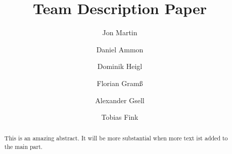 \documentclass[runningheads,a4paper]{llncs}
\begin{document}
\mainmatter  %

\title{Team Description Paper}


%
%
\author{Jon Martin
\and Daniel Ammon\and Dominik Heigl\and Florian Gram{\ss} \and Alexander Gsell \and Tobias Fink
}



%
%

\maketitle


\begin{abstract}
This is an amazing abstract. It will be more substantial when more text ist added to the main part.
\end{abstract}

\end{document}
